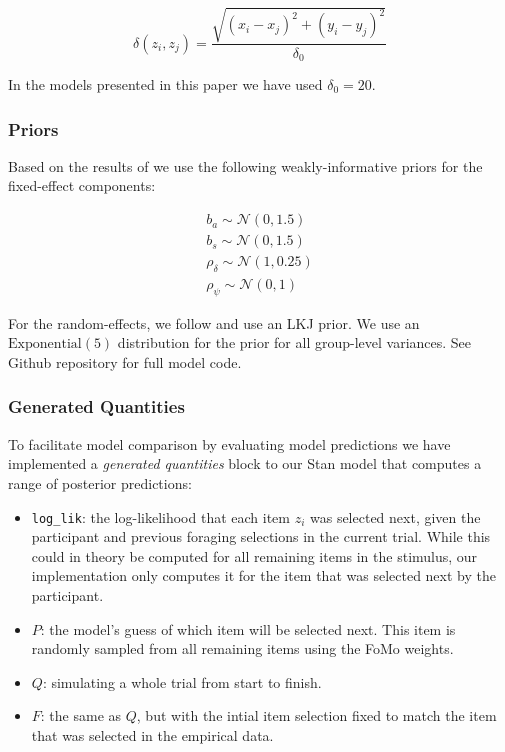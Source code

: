 \documentclass[man, floatsintext]{apa7}
\begin{document}
\begin{equation}
\label{eq:delta0}
    \delta(z_i, z_j) = \frac{\sqrt{(x_i - x_j)^2 + (y_i-y_j)^2}}{\delta_0}
\end{equation}

In the models presented in this paper we have used $\delta_0=20$. 

\subsubsection{Priors}

 Based on the results of \cite{clarke2022foraging} we use the following weakly-informative priors for the fixed-effect components:

\begin{eqnarray}
    b_a \sim \mathcal{N}(0, 1.5)\\
    b_s \sim \mathcal{N}(0, 1.5)\\
    \rho_{\delta} \sim \mathcal{N}(1, 0.25)\\
    \rho_{\psi}  \sim \mathcal{N}(0, 1)
\end{eqnarray}

For the random-effects, we follow \cite{LEWANDOWSKI20091989} and use an LKJ prior. We use an $\text{Exponential}(5)$ distribution for the prior for all group-level variances. See Github repository for full model code. 



\subsubsection{Generated Quantities}

To facilitate model comparison by evaluating model predictions we have implemented a \textit{generated quantities} block to our Stan model that computes a range of posterior predictions:

\begin{itemize}
\item \texttt{log\_lik}: the log-likelihood that each item $z_i$ was selected next, given the participant and previous foraging selections in the current trial. While this could in theory be computed for all remaining items in the stimulus, our implementation only computes it for the item that was selected next by the participant. \\

\item $P$: the model's guess of which item will be selected next. This item is randomly sampled from all remaining items using the FoMo weights. \\
\item $Q$: simulating a whole trial from start to finish. \\
\item $F$: the same as $Q$, but with the intial item selection fixed to match the item that was selected in the empirical data.
\end{itemize}
\end{document}
